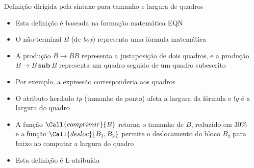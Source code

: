 \begin{frame}[fragile]{Definição dirigida pela sintaxe para tamanho e largura de quadros}

    \begin{itemize}
        \item Esta definição é baseada na formação matemática EQN

        \item O não-terminal $B$ (de \textit{box}) representa uma fórmula matemática

        \item A produção $B\to BB$ representa a justaposição de dois quadros, e a produção $B\to B\ \textbf{sub}\ B$ representa um quadro seguido de um
            quadro subescrito

        \item Por exemplo, a expressão  corresponderia aos quadros
        \begin{figure}[h]
            \centering
        \end{figure}

        \item O atributo herdado $tp$ (tamanho de ponto) afeta a largura da fórmula e $lg$ é a largura do quadro

        \item A função $\Call{comprimir}{B}$ retorna o tamanho de $B$, reduzido em 30\% e a função $\Call{desloc}{B_1, B_2}$ permite o deslocamento do bloco
            $B_2$ para baixo ao computar a largura do quadro

        \item Esta definição é L-atribuída
    \end{itemize}

\end{frame}

